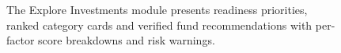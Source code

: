
\begin{figure}[H]
\centering
{}
\caption{The Explore Investments module presents readiness priorities, ranked category cards and verified fund recommendations with per-factor score breakdowns and risk warnings.}
\label{fig:explore}
\end{figure}